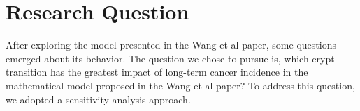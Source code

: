 \section{Research Question}

After exploring the model presented in the Wang et al paper, some questions emerged about its behavior. The question we chose to pursue is, which crypt transition has the greatest impact of long-term cancer incidence in the mathematical model proposed in the Wang et al paper? To address this question, we adopted a sensitivity analysis approach.